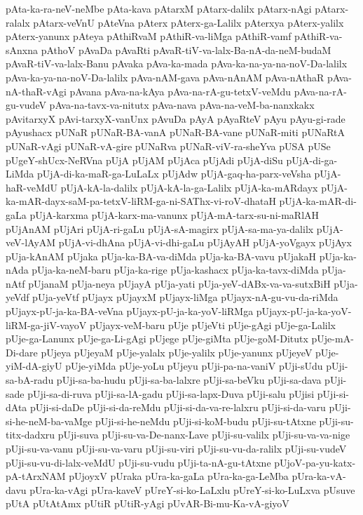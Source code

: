 {pAta-ka-ra-neV-neMbe
pAta-kava
pAtarxM
pAtarx-dalilx
pAtarx-nAgi
pAtarx-ralalx
pAtarx-veVnU
pAteVna
pAterx
pAterx-ga-Lalilx
pAterxya
pAterx-yalilx
pAterx-yanunx
pAteya
pAthiRvaM
pAthiR-va-liMga
pAthiR-vamf
pAthiR-va-sAnxna
pAthoV
pAvaDa
pAvaRti
pAvaR-tiV-va-lalx-Ba-nA-da-neM-budaM
pAvaR-tiV-va-lalx-Banu
pAvaka
pAva-ka-mada
pAva-ka-na-ya-na-noV-Da-lalilx
pAva-ka-ya-na-noV-Da-lalilx
pAva-nAM-gava
pAva-nAnAM
pAva-nAthaR
pAva-nA-thaR-vAgi
pAvana
pAva-na-kAya
pAva-na-rA-gu-tetxV-veMdu
pAva-na-rA-gu-vudeV
pAva-na-tavx-va-nitutx
pAva-nava
pAva-na-veM-ba-nanxkakx
pAvitarxyX
pAvi-tarxyX-vanUnx
pAvuDa
pAyA
pAyaRteV
pAyu
pAyu-gi-rade
pAyushacx
pUNaR
pUNaR-BA-vanA
pUNaR-BA-vane
pUNaR-miti
pUNaRtA
pUNaR-vAgi
pUNaR-vA-gire
pUNaRva
pUNaR-viV-ra-sheYva
pUSA
pUSe
pUgeY-shUcx-NeRVna
pUjA
pUjAM
pUjAca
pUjAdi
pUjA-diSu
pUjA-di-ga-LiMda
pUjA-di-ka-maR-ga-LuLaLx
pUjAdw
pUjA-gaq-ha-parx-veVsha
pUjA-haR-veMdU
pUjA-kA-la-dalilx
pUjA-kA-la-ga-Lalilx
pUjA-ka-mARdayx
pUjA-ka-mAR-dayx-saM-pa-tetxV-liRM-ga-ni-SAThx-vi-roV-dhataH
pUjA-ka-mAR-di-gaLa
pUjA-karxma
pUjA-karx-ma-vanunx
pUjA-mA-tarx-su-ni-maRlAH
pUjAnAM
pUjAri
pUjA-ri-gaLu
pUjA-sA-magirx
pUjA-sa-ma-ya-dalilx
pUjA-veV-lAyAM
pUjA-vi-dhAna
pUjA-vi-dhi-gaLu
pUjAyAH
pUjA-yoVgayx
pUjAyx
pUja-kAnAM
pUjaka
pUja-ka-BA-va-diMda
pUja-ka-BA-vavu
pUjakaH
pUja-ka-nAda
pUja-ka-neM-baru
pUja-ka-rige
pUja-kashacx
pUja-ka-tavx-diMda
pUja-nAtf
pUjanaM
pUja-neya
pUjayA
pUja-yati
pUja-yeV-dABx-va-va-sutxBiH
pUja-yeVdf
pUja-yeVtf
pUjayx
pUjayxM
pUjayx-liMga
pUjayx-nA-gu-vu-da-riMda
pUjayx-pU-ja-ka-BA-veVna
pUjayx-pU-ja-ka-yoV-liRMga
pUjayx-pU-ja-ka-yoV-liRM-ga-jiV-vayoV
pUjayx-veM-baru
pUje
pUjeVti
pUje-gAgi
pUje-ga-Lalilx
pUje-ga-Lanunx
pUje-ga-Li-gAgi
pUjege
pUje-giMta
pUje-goM-Ditutx
pUje-mA-Di-dare
pUjeya
pUjeyaM
pUje-yalalx
pUje-yalilx
pUje-yanunx
pUjeyeV
pUje-yiM-dA-giyU
pUje-yiMda
pUje-yoLu
pUjeyu
pUji-pa-na-vaniV
pUji-sUdu
pUji-sa-bA-radu
pUji-sa-ba-hudu
pUji-sa-ba-lalxre
pUji-sa-beVku
pUji-sa-dava
pUji-sade
pUji-sa-di-ruva
pUji-sa-lA-gadu
pUji-sa-lapx-Duva
pUji-salu
pUjisi
pUji-si-dAta
pUji-si-daDe
pUji-si-da-reMdu
pUji-si-da-va-re-lalxru
pUji-si-da-varu
pUji-si-he-neM-ba-vaMge
pUji-si-he-neMdu
pUji-si-koM-budu
pUji-su-tAtxne
pUji-su-titx-dadxru
pUji-suva
pUji-su-va-De-nanx-Lave
pUji-su-valilx
pUji-su-va-va-nige
pUji-su-va-vanu
pUji-su-va-varu
pUji-su-viri
pUji-su-vu-da-ralilx
pUji-su-vudeV
pUji-su-vu-di-lalx-veMdU
pUji-su-vudu
pUji-ta-nA-gu-tAtxne
pUjoV-pa-yu-katx-pA-tArxNAM
pUjoyxV
pUraka
pUra-ka-gaLa
pUra-ka-ga-LeMba
pUra-ka-vA-davu
pUra-ka-vAgi
pUra-kaveV
pUreY-si-ko-LaLxlu
pUreY-si-ko-LuLxva
pUsuve
pUtA
pUtAtAmx
pUtiR
pUtiR-yAgi
pUvAR-Bi-mu-Ka-vA-giyoV
}
